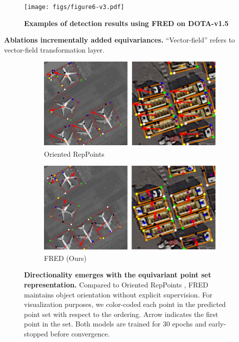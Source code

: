 \documentclass[letterpaper]{article} %
\begin{document}
\begin{figure}[t]
\centering
\texttt{[image: figs/figure6-v3.pdf]}
\caption{\textbf{Examples of detection results using FRED on DOTA-v1.5}}
\label{fig:figure6}
\end{figure}

\begin{table}[t]
    
\caption{\textbf{Ablations incrementally added equivariances.} ``Vector-field'' refers to vector-field transformation layer. }
\label{table:equivariance-ablation}
\end{table}



\begin{figure}[t]
    \centering
    \begin{subfigure}{.48\linewidth}
        \centering
        \includegraphics[width=\linewidth]{figs/figure7_rep-v2.pdf}
        \caption{Oriented RepPoints}
        \label{fig:previous}
    \end{subfigure}
    \begin{subfigure}{.48\linewidth}
        \centering
        \includegraphics[width=\linewidth]{figs/figure7_ours-v2.pdf}
        \caption{FRED (Ours)}
        \label{fig:proposed}
    \end{subfigure}
    \caption{\textbf{Directionality emerges with the equivariant point set representation.} Compared to Oriented RepPoints \citep{li2022oriented}, FRED maintains object orientation without explicit supervision. For visualization purposes, we color-coded each point in the predicted point set with respect to the ordering. Arrow indicates the first point in the set. Both models are trained for 30 epochs and early-stopped before convergence.}
    \label{fig:figure5}
\end{figure}
\end{document}
